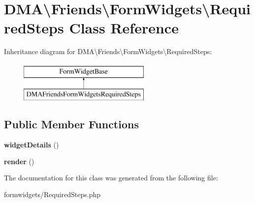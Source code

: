 \hypertarget{classDMA_1_1Friends_1_1FormWidgets_1_1RequiredSteps}{\section{D\-M\-A\textbackslash{}Friends\textbackslash{}Form\-Widgets\textbackslash{}Required\-Steps Class Reference}
\label{classDMA_1_1Friends_1_1FormWidgets_1_1RequiredSteps}
}
Inheritance diagram for D\-M\-A\textbackslash{}Friends\textbackslash{}Form\-Widgets\textbackslash{}Required\-Steps\-:\begin{figure}[H]
\begin{center}
\leavevmode
\includegraphics[height=2.000000cm]{dd/db5/classDMA_1_1Friends_1_1FormWidgets_1_1RequiredSteps}
\end{center}
\end{figure}
\subsection*{Public Member Functions}
\begin{DoxyCompactItemize}
\item 
\hypertarget{classDMA_1_1Friends_1_1FormWidgets_1_1RequiredSteps_a7515c39fb1cd2bf16604b907e98485e2}{{\bfseries widget\-Details} ()}\label{classDMA_1_1Friends_1_1FormWidgets_1_1RequiredSteps_a7515c39fb1cd2bf16604b907e98485e2}

\item 
\hypertarget{classDMA_1_1Friends_1_1FormWidgets_1_1RequiredSteps_ae3ebaf8a7cf65ac562796d7bd3bc4567}{{\bfseries render} ()}\label{classDMA_1_1Friends_1_1FormWidgets_1_1RequiredSteps_ae3ebaf8a7cf65ac562796d7bd3bc4567}

\end{DoxyCompactItemize}


The documentation for this class was generated from the following file\-:\begin{DoxyCompactItemize}
\item 
formwidgets/Required\-Steps.\-php\end{DoxyCompactItemize}
